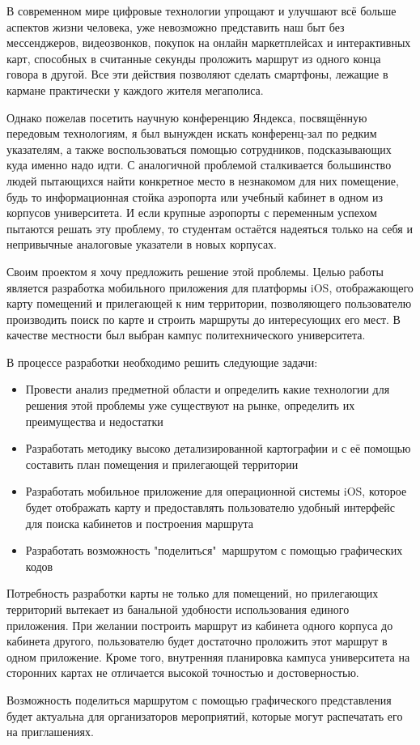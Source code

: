 В современном мире цифровые технологии упрощают и улучшают всё больше аспектов жизни человека, уже невозможно представить наш быт без мессенджеров, видеозвонков, покупок на онлайн маркетплейсах и интерактивных карт, способных в считанные секунды проложить маршрут из одного конца говора в другой. Все эти действия позволяют сделать смартфоны, лежащие в кармане практически у каждого жителя мегаполиса.

Однако пожелав посетить научную конференцию Яндекса, посвящённую передовым технологиям, я был вынужден искать конференц-зал по редким указателям, а также воспользоваться помощью сотрудников, подсказывающих куда именно надо идти. С аналогичной проблемой сталкивается большинство людей пытающихся найти конкретное место в незнакомом для них помещение, будь то информационная стойка аэропорта или учебный кабинет в одном из корпусов университета.
И если крупные аэропорты с переменным успехом пытаются решать эту проблему, то студентам остаётся надеяться только на себя и непривычные аналоговые указатели в новых корпусах.

Своим проектом я хочу предложить решение этой проблемы. Целью работы является разработка мобильного приложения для платформы iOS, отображающего карту помещений и прилегающей к ним территории, позволяющего пользователю производить поиск по карте и строить маршруты до интересующих его мест. В качестве местности был выбран кампус политехнического университета.

В процессе разработки необходимо решить следующие задачи:
\begin{itemize}
  \item Провести анализ предметной области и определить какие технологии для решения этой проблемы уже существуют на рынке, определить их преимущества и недостатки
  \item Разработать методику высоко детализированной картографии и с её помощью составить план помещения и прилегающей территории
  \item Разработать мобильное приложение для операционной системы iOS, которое будет отображать карту и предоставлять пользователю удобный интерфейс для поиска кабинетов и построения маршрута
  \item Разработать возможность "поделиться"\ маршрутом с помощью графических кодов
\end{itemize}

Потребность разработки карты не только для помещений, но прилегающих территорий вытекает из банальной удобности использования единого приложения. При желании построить маршрут из кабинета одного корпуса до кабинета другого, пользователю будет достаточно проложить этот маршрут в одном приложение. Кроме того, внутренняя планировка кампуса университета на сторонних картах не отличается высокой точностью и достоверностью.

Возможность поделиться маршрутом с помощью графического представления будет актуальна для организаторов мероприятий, которые могут распечатать его на приглашениях.
